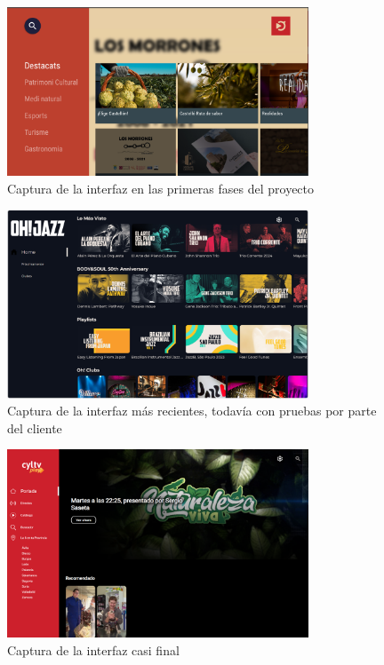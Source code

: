 \begin{figure}[hp!]
    \centering
    \includegraphics[width=0.8\textwidth]{imaxes/UX_inicios.png}
    \caption{Captura de la interfaz en las primeras fases del proyecto}
    \label{fig:UX_inicios}
\end{figure}
\begin{figure}[hp!]
    \centering
    \includegraphics[width=0.8\textwidth]{imaxes/Home_desp_OhJazz.png}
    \caption{Captura de la interfaz más recientes, todavía con pruebas por parte del cliente}
    \label{fig:Home_desp_OhJazz}
\end{figure}
\begin{figure}[hp!]
    \centering
    \includegraphics[width=0.8\textwidth]{imaxes/Home_CyLTv.png}
    \caption{Captura de la interfaz casi final}
    \label{fig:Home_CyLTv}
\end{figure}

